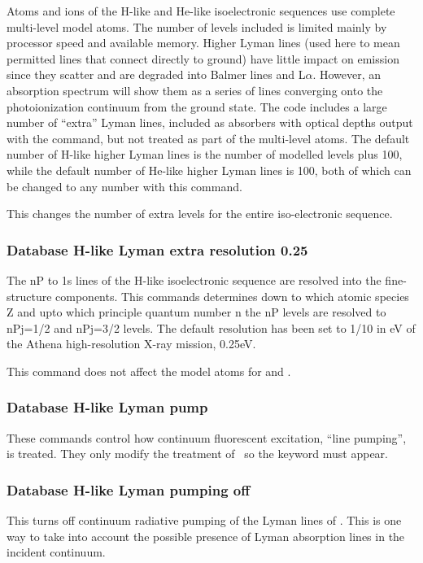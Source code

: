 Atoms and ions of the H-like and He-like
isoelectronic sequences use complete multi-level model atoms.
The number of levels included is limited mainly by processor speed and
available memory.
Higher Lyman lines (used here to mean permitted lines that connect directly
to ground) have little impact on emission since they
scatter and are degraded
into Balmer lines and L$\alpha $.
However, an absorption spectrum will show them
as a series of lines converging onto the photoionization continuum from
the ground state.
The code includes a large number of ``extra'' Lyman lines,
included as absorbers with optical depths output with
the  command,
but not treated as part of the multi-level atoms.
The default number of H-like higher Lyman lines is the
number of modelled levels plus 100, while the default number
of He-like higher Lyman lines is 100, both of which can be
changed to any number with this command.

This changes the number of extra levels for the entire iso-electronic sequence.

\subsubsection{Database H-like Lyman extra resolution 0.25}

The nP to 1s lines of the H-like isoelectronic sequence are resolved into the
fine-structure components. This commands determines down to which atomic species Z
and upto which principle quantum number n the nP levels are resolved to nPj=1/2 and
nPj=3/2 levels. The default resolution has been set to 1/10 in eV of the Athena
high-resolution X-ray mission, 0.25eV.

This command does not affect the model atoms for  and .

\subsubsection{Database H-like Lyman pump}  

These commands control how continuum fluorescent excitation, ``line pumping'', is treated.
They only modify the treatment of \hi\ so the  keyword must appear.

\subsubsection{Database H-like Lyman pumping off}  
This turns off continuum radiative pumping of the Lyman lines of \hi.
This is one way to take into account the possible
presence of Lyman absorption lines in the incident continuum.

